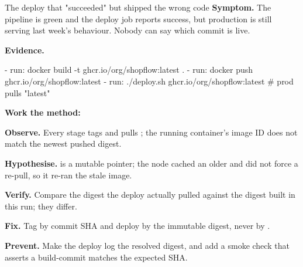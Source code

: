 
\begin{debuglab}{The deploy that "succeeded" but shipped the wrong code}
\textbf{Symptom.} The pipeline is green and the deploy job reports success, but production is still serving last week's behaviour. Nobody can say which commit is live.

\smallskip\textbf{Evidence.}
\begin{yamlbox}
- run: docker build -t ghcr.io/org/shopflow:latest .
- run: docker push ghcr.io/org/shopflow:latest
- run: ./deploy.sh ghcr.io/org/shopflow:latest   # prod pulls "latest"
\end{yamlbox}

\textbf{Work the method:}
\begin{tickcheck}
  \item \textbf{Observe.} Every stage tags and pulls ; the running container's image ID does not match the newest pushed digest.
  \item \textbf{Hypothesise.}  is a mutable pointer; the node cached an older  and  did not force a re-pull, so it re-ran the stale image.
  \item \textbf{Verify.} Compare the  digest the deploy actually pulled against the digest built in this run; they differ.
  \item \textbf{Fix.} Tag by commit SHA and deploy by the immutable digest, never by .
  \item \textbf{Prevent.} Make the deploy log the resolved digest, and add a smoke check that asserts a  build-commit matches the expected SHA.
\end{tickcheck}
\end{debuglab}


